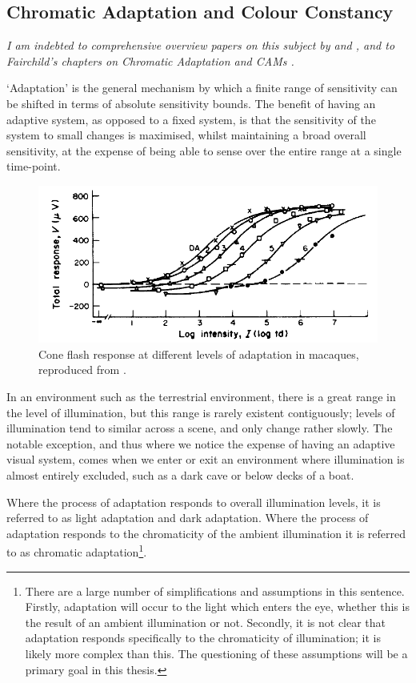 \subsection{Chromatic Adaptation and Colour Constancy}

\textit{I am indebted to comprehensive overview papers on this subject by \citet{foster_color_2011} and \citet{smithson_sensory_2005}, and to Fairchild's chapters on Chromatic Adaptation and \glspl{CAM} \citep[ch. 8 \& 9]{fairchild_color_2013}.}

\bigskip

`Adaptation' is the general mechanism by which a finite range of sensitivity can be shifted in terms of absolute sensitivity bounds. The benefit of having an adaptive system, as opposed to a fixed system, is that the sensitivity of the system to small changes is maximised, whilst maintaining a broad overall sensitivity, at the expense of being able to sense over the entire range at a single time-point. 

\begin{figure}[htbp]
\includegraphics[max width=\textwidth]{figs/LitRev/Valeton.png}
\caption{Cone flash response at different levels of adaptation in macaques, reproduced from \citet{valeton_light_1983}.}
\label{fig:Valeton}
\end{figure}

In an environment such as the terrestrial environment, there is a great range in the level of illumination, but this range is rarely existent contiguously; levels of illumination tend to similar across a scene, and only change rather slowly. The notable exception, and thus where we notice the expense of having an adaptive visual system, comes when we enter or exit an environment where illumination is almost entirely excluded, such as a dark cave or below decks of a boat. 

Where the process of adaptation responds to overall illumination levels, it is referred to as light adaptation and dark adaptation. Where the process of adaptation responds to the chromaticity of the ambient illumination it is referred to as chromatic adaptation\footnote{There are a large number of simplifications and assumptions in this sentence. Firstly, adaptation will occur to the light which enters the eye, whether this is the result of an ambient illumination or not. Secondly, it is not clear that adaptation responds specifically to the chromaticity of illumination; it is likely more complex than this. The questioning of these assumptions will be a primary goal in this thesis.}.

